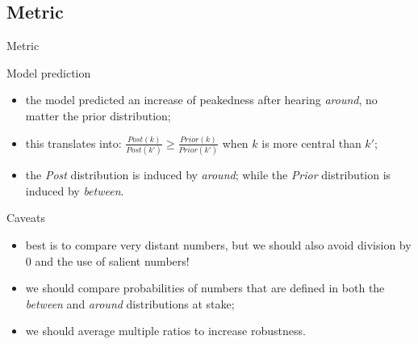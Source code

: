 \documentclass[xcolor=table, hyperref={pdfpagelabels=false}]{beamer}
\begin{document}
\subsection{Metric}
\begin{frame}{Metric}
\begin{block}{Model prediction}
	\begin{itemize}
		\item the model predicted an increase of peakedness after hearing \textit{around}, no matter the prior distribution; \pause
		\item this translates into: \textbf{$\frac{Post(k)}{Post(k')} \geq \frac{Prior(k)}{Prior(k')}$} when $k$ is more central than $k'$; \pause
		\item the \textit{Post} distribution is induced by \textit{around}; while the \textit{Prior} distribution is induced by \textit{between}.
	\end{itemize}
\end{block}\pause
\begin{alertblock}{Caveats}
	\begin{itemize}
		\item best is to compare very distant numbers, but we should also avoid division by 0 and the use of salient numbers! \pause
		\item we should compare probabilities of numbers that are defined in both the \textit{between} and \textit{around} distributions at stake; \pause
		\item we should average multiple ratios to increase robustness.
	\end{itemize}
\end{alertblock}
\end{frame}
\end{document}
